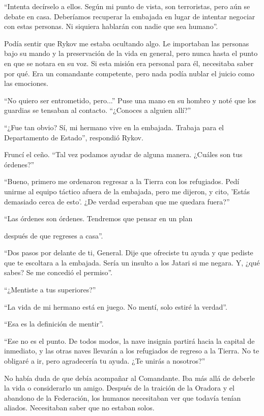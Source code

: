 \documentclass[spanish,12pt,a4paper,oneside,titlepage]{book}
\begin{document}
    ``Intenta decírselo a ellos. Según mi punto de vista, son terroristas, pero aún se debate en casa. Deberíamos recuperar la embajada en lugar de intentar negociar con estas personas. Ni siquiera hablarán con nadie que sea humano''.

    Podía sentir que Rykov me estaba ocultando algo. Le importaban las personas bajo su mando y la preservación de la vida en general, pero nunca hasta el punto en que se notara en su voz. Si esta misión era personal para él, necesitaba saber por qué. Era un comandante competente, pero nada podía nublar el juicio como las emociones.

    ``No quiero ser entrometido, pero...'' Puse una mano en su hombro y noté que los guardias se tensaban al contacto. ``¿Conoces a alguien allí?''

    ``¿Fue tan obvio? Sí, mi hermano vive en la embajada. Trabaja para el Departamento de Estado'', respondió Rykov.

    Fruncí el ceño. ``Tal vez podamos ayudar de alguna manera. ¿Cuáles son tus órdenes?''

    ``Bueno, primero me ordenaron regresar a la Tierra con los refugiados. Pedí unirme al equipo táctico afuera de la embajada, pero me dijeron, y cito, 'Estás demasiado cerca de esto'. ¿De verdad esperaban que me quedara fuera?''

    ``Las órdenes son órdenes. Tendremos que pensar en un plan

    después de que regreses a casa''.

    ``Dos pasos por delante de ti, General. Dije que ofreciste tu ayuda y que pediste que te escoltara a la embajada. Sería un insulto a los Jatari si me negara. Y, ¿qué sabes? Se me concedió el permiso''.

    ``¿Mentiste a tus superiores?''

    ``La vida de mi hermano está en juego. No mentí, solo estiré la verdad''.

    ``Esa es la definición de mentir''.

    ``Ese no es el punto. De todos modos, la nave insignia partirá hacia la capital de inmediato, y las otras naves llevarán a los refugiados de regreso a la Tierra. No te obligaré a ir, pero agradecería tu ayuda. ¿Te unirás a nosotros?''

    No había duda de que debía acompañar al Comandante. Iba más allá de deberle la vida o considerarlo un amigo. Después de la traición de la Oradora y el abandono de la Federación, los humanos necesitaban ver que todavía tenían aliados. Necesitaban saber que no estaban solos.
\end{document}
